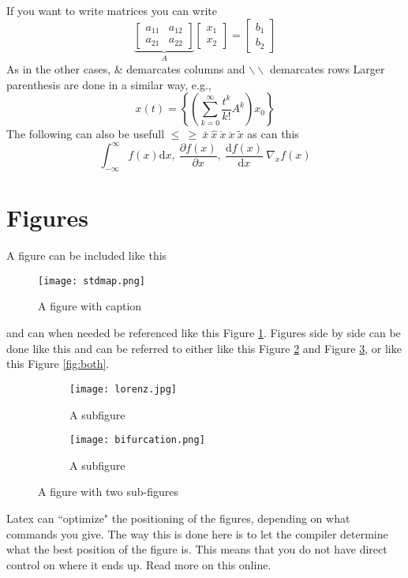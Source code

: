 \documentclass[11pt]{article}
\begin{document}
If you want to write matrices you can write
\begin{equation}
\underbrace{
\left[
\begin{array}{cc}
a_{11} & a_{12}\\
a_{21} & a_{22}
\end{array}
\right]
}_{A}
\left[
\begin{array}{c}
x_1 \\
x_2
\end{array}
\right]
=
\left[
\begin{array}{c}
b_1 \\
b_2
\end{array} \right]
\end{equation}
As in the other cases, \& demarcates columns and $\backslash\backslash$ demarcates rows
Larger parenthesis are done in a similar way, e.g.,
\begin{equation}
x(t) = \left\{ \left( \sum_{k=0}^\infty \frac{t^k}{k!}A^k\right)x_0 \right\}
\end{equation}
The following can also be usefull $\leq \  \geq \ \bar{x} \ \hat{x} \ \dot{x} \ \ddot{x} \ \tilde{x} $ as can this
\begin{equation}
\int_{-\infty}^{\infty}f(x)\mathrm{d}x, \ \frac{\partial f(x)}{\partial x}, \ \frac{\mathrm{d}f(x)}{\mathrm{d}x} \ \nabla_x f(x)
\end{equation}
\section{Figures}
A figure can be included like this
\begin{figure}[h]
\begin{center}
\texttt{[image: stdmap.png]}
\caption{ A figure with caption \label{fig:fig1}}
\end{center}
\end{figure}
and can when needed be referenced like this Figure \ref{fig:fig1}.
Figures side by side can be done like this and can be referred to either like this Figure \ref{fig:sub1} and Figure \ref{fig:sub2}, or like this Figure \eqref{fig:both}.
\begin{figure}[h]
\centering
\begin{subfigure}{.5\linewidth}
  \centering
  \texttt{[image: lorenz.jpg]}
  \caption{A subfigure}
  \label{fig:sub1}
\end{subfigure}%
\begin{subfigure}{.5\linewidth}
  \centering
  \texttt{[image: bifurcation.png]}
  \caption{A subfigure}
  \label{fig:sub2}
\end{subfigure}
\caption{A figure with two sub-figures}
\label{fig:both}
\end{figure}
Latex can ``optimize" the positioning of the figures, depending on what commands you give. The way this is done here is to let the compiler determine what the best position of the figure is. This means that you do not have direct control on where it ends up. Read more on this online.
\end{document}

